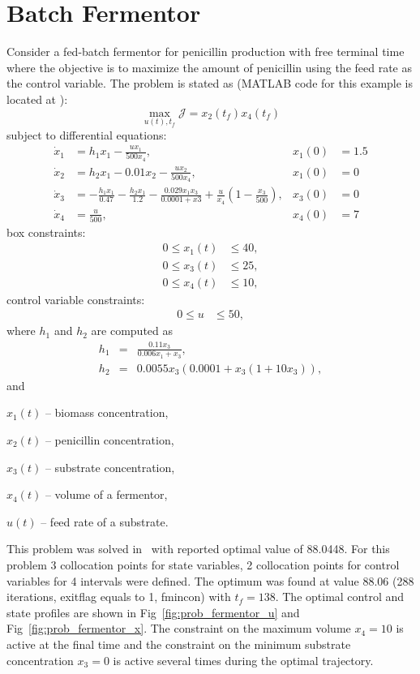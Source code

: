 \section{Batch Fermentor}
\label{sec:prob_fermentor}
Consider a fed-batch fermentor for penicillin production with free
terminal time~\citep{ban05} where the objective is to maximize the
amount of penicillin using the feed rate as the control variable. The
problem is stated as (MATLAB code for this example is located at
): 
\begin{equation}
\max_{u(t),t_f} \mathcal{J} = x_{2}(t_{f})x_{4}(t_{f})
\end{equation}
subject to differential equations:
\begin{align}
\dot{x}_1 & = 
h_1x_1-\frac{u x_1}{500 x_4}, &
x_1(0) &= 1.5  \\
\dot{x}_2 & = 
h_2x_1-0.01x_2-\frac{ux_2}{500x_4}, &
x_1(0) &= 0  \\
\dot{x}_3 &=
-\frac{h_1x_1}{0.47}-\frac{h_2x_1}{1.2}-\frac{0.029x_1x_3}{0.0001+x3}
  +\frac{u}{x_4} \left( 1-\frac{x_3}{500} \right),
&
x_3(0) &= 0 \\ 
\dot{x}_4 &= \frac{u}{500}, &
x_4(0) &= 7
\end{align}
box constraints:
\begin{align}
0 \le x_1(t) &\le 40, \\
0 \le x_3(t) &\le 25, \\
0 \le x_4(t) &\le 10, 
\end{align}
control variable constraints:
\begin{align}
0 \le u &\le 50, 
\end{align}
where $h_1$ and $h_2$ are computed as
\begin{eqnarray} 
h_1 &=& \frac{0.11x_3}{0.006x_1+x_3}, \\
h_2 &=& 0.0055x_3(0.0001+x_3(1+10x_3)),
\end{eqnarray}
and 
\begin{description}
	\item $x_1(t)$ -- biomass concentration,
	\item $x_2(t)$ -- penicillin concentration,
	\item $x_3(t)$ -- substrate concentration,
	\item $x_4(t)$ -- volume of a fermentor,
	\item $u(t)$ -- feed rate of a substrate.
\end{description}

This problem was solved in~\citep{rut10} with reported optimal value
of 88.0448. For this problem 3 collocation points for state variables,
2 collocation points for control variables for 4 intervals were
defined. The optimum was found at value 88.06 (288 iterations,
exitflag equals to 1, fmincon) with $t_f = 138$. The optimal control
and state profiles are shown in Fig~\ref{fig:prob_fermentor_u} and
Fig~\ref{fig:prob_fermentor_x}. The constraint on the maximum volume
$x_4=10$ is active at the final time and the constraint on the minimum
substrate concentration $x_3=0$ is active several times during the
optimal trajectory.

